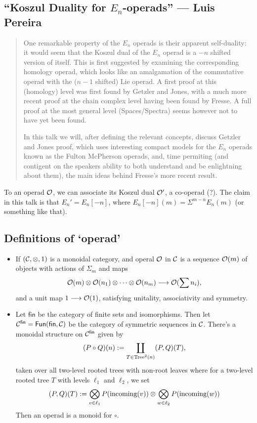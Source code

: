 \documentclass[11pt]{article}
\newcommand{\KanSemResponse}[1]
{
\thispagestyle{fancy}
\subsection*{#1}
}
\begin{document}
\begin{LuisKoszulDuality}
\KanSemResponse
{``Koszul Duality for $E_n$-operads'' --- Luis Pereira}
\begin{abstract}
One remarkable property of the $E_n$ operads is their apparent self-duality: it would seem that the Koszul dual of the $E_n$ operad is a $-n$ shifted version of itself. This is first suggested by examining the corresponding homology operad, which looks like an amalgamation of the commutative operad with the ($n-1$ shifted) Lie operad. A first proof at this (homology) level was first found by Getzler and Jones, with a much more recent proof at the chain complex level having been found by Fresse. A full proof at the most general level (Spaces/Spectra) seems however not to have yet been found.

 
In this talk we will, after defining the relevant concepts, discuss Getzler and Jones proof, which uses interesting compact models for the $E_n$ operads known as the Fulton McPherson operads, and, time permiting (and contigent on the speakers ability to both understand and be enlightning about them), the main ideas behind Fresse's more recent result.
\end{abstract}
To an operad $\mathcal{O}$, we can associate its Koszul dual $\mathcal{O}'$, a co-operad (?). The claim in this talk is that $E_n'=E_n[-n]$, where $E_n[-n](m)=\Sigma^{m-n}E_n(m)$ (or something like that).
\subsection*{Definitions of `operad'}
\begin{itemize}\squishlist
\item If $(\mathcal{C},\otimes,1)$ is a monoidal category, and operal $\mathcal{O}$ in $\mathcal{C}$ is a sequence $\mathcal{O}(m)$ of objects with actions of $\Sigma_m$ and maps
\[\mathcal{O}(m)\otimes\mathcal{O}(n_1)\otimes\cdots\otimes\mathcal{O}(n_m)\longrightarrow\mathcal{O}(\sum n_i),\]
and a unit map $1\longrightarrow\mathcal{O}(1)$, satisfying unitality, associativity and symmetry.
\item 
Let $\mathsf{fin}$ be the category of finite sets and isomorphisms. Then let $\mathcal{C}^{\mathsf{fin}}=\operatorname{{\mathsf{Fun}}}(\mathsf{fin},\mathcal{C})$ be the category of symmetric sequences in $\mathcal{C}$. There's a monoidal structure on $\mathcal{C}^{\mathsf{fin}}$ given by
\[(P\circ Q)(n):=\coprod_{T\in\textup{Tree}^2(n)}(P,Q)(T),\]
taken over all two-level rooted trees with non-root leaves 
where for a two-level rooted tree $T$ with levels $\ell_1$ and $\ell_2$, we set \[(P,Q)(T):=\bigotimes_{v\in\ell_1}P(\textup{incoming}(v))\otimes\bigotimes_{w\in\ell_2}P(\textup{incoming}(w))\]
Then an operad is a monoid for $\circ$.


\end{itemize}
\end{LuisKoszulDuality}
\end{document}
